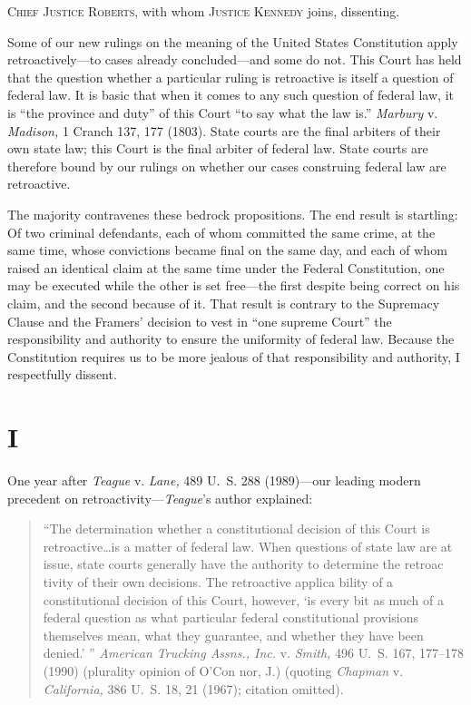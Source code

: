 
\setcounter{page}{291}

  \textsc{Chief Justice Roberts,} with whom \textsc{Justice Kennedy} joins, dissenting.

  Some of our new rulings on the meaning of the United States Constitution apply retroactively---to cases already concluded---and some do not. This Court has held that the question whether a particular ruling is retroactive is itself a question of federal law. It is basic that when it comes to any such question of federal law, it is ``the province and duty'' of this Court ``to say what the law is.'' \emph{Marbury} v. \emph{Madison,} 1 Cranch 137, 177 (1803). State courts are the final arbiters of their own state law; this Court is the final arbiter \newpage  of federal law. State courts are therefore bound by our rulings on whether our cases construing federal law are retroactive.

  The majority contravenes these bedrock propositions. The end result is startling: Of two criminal defendants, each of whom committed the same crime, at the same time, whose convictions became final on the same day, and each of whom raised an identical claim at the same time under the Federal Constitution, one may be executed while the other is set free---the first despite being correct on his claim, and the second because of it. That result is contrary to the Supremacy Clause and the Framers' decision to vest in ``one supreme Court'' the responsibility and authority to ensure the uniformity of federal law. Because the Constitution requires us to be more jealous of that responsibility and authority, I respectfully dissent.

\section{I}

  One year after \emph{Teague} v. \emph{Lane,} 489 U.~S. 288 (1989)---our leading modern precedent on retroactivity---\emph{Teague}'s author explained:

      \begin{quote}

		  ``The determination whether a constitutional decision of this Court is retroactive\dots is a matter of federal law. When questions of state law are at issue, state courts generally have the authority to determine the retroac tivity of their own decisions. The retroactive applica bility of a constitutional decision of this Court, however, ‘is every bit as much of a federal question as what particular federal constitutional provisions themselves mean, what they guarantee, and whether they have been denied.' '' \emph{American Trucking Assns., Inc.} v. \emph{Smith,} 496 U.~S. 167, 177--178 (1990) (plurality opinion of O'Con nor, J.) (quoting \emph{Chapman} v. \emph{California,} 386 U.~S. 18, 21 (1967); citation omitted).

      \end{quote}

